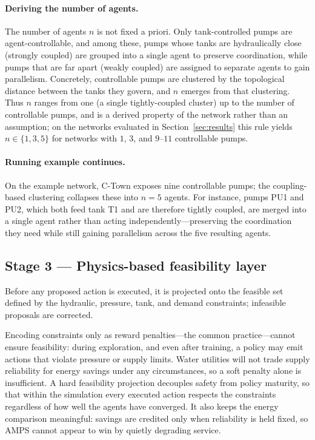 \documentclass[11pt,a4paper]{article}
\begin{document}
\paragraph{Deriving the number of agents.} The number of agents $n$ is not fixed
a priori. Only tank-controlled pumps are agent-controllable, and among these,
pumps whose tanks are hydraulically close (strongly coupled) are grouped into a
single agent to preserve coordination, while pumps that are far apart (weakly
coupled) are assigned to separate agents to gain parallelism. Concretely,
controllable pumps are clustered by the topological distance between the tanks
they govern, and $n$ emerges from that clustering. Thus $n$ ranges from one (a
single tightly-coupled cluster) up to the number of controllable pumps, and is a
derived property of the network rather than an assumption; on the networks
evaluated in Section~\ref{sec:results} this rule yields $n \in \{1,3,5\}$ for
networks with $1$, $3$, and $9$--$11$ controllable pumps.

\paragraph{Running example continues.} On the example network, C-Town exposes
nine controllable pumps; the coupling-based clustering collapses these into
$n=5$ agents. For instance, pumps PU1 and PU2, which both feed tank T1 and are
therefore tightly coupled, are merged into a single agent rather than acting
independently---preserving the coordination they need while still gaining
parallelism across the five resulting agents.

\subsection{Stage 3 --- Physics-based feasibility layer}
\label{sec:stage3}
Before any proposed action is executed, it is projected onto the feasible set
defined by the hydraulic, pressure, tank, and demand constraints; infeasible
proposals are corrected.

Encoding constraints only as reward penalties---the
common practice---cannot ensure feasibility: during exploration, and even
after training, a policy may emit actions that violate pressure or supply limits.
Water utilities will not trade supply reliability for energy savings under any
circumstances, so a soft penalty alone is insufficient. A hard feasibility
projection decouples safety from policy maturity, so that within the simulation every executed
action respects the constraints regardless of how well the agents have converged.
It also keeps the energy comparison meaningful: savings are credited only when
reliability is held fixed, so AMPS cannot appear to win by quietly degrading
service.
\end{document}
